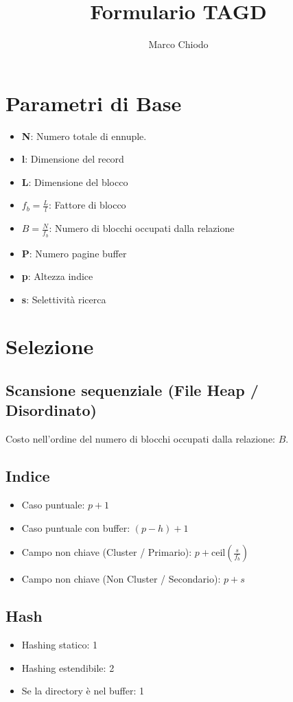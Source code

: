 \documentclass[a4paper, 11pt]{article}
\title{Formulario TAGD}
\author{Marco Chiodo}
\date{} %
\begin{document}
\maketitle


\section{Parametri di Base}
\begin{itemize}
    \item \textbf{N}: Numero totale di ennuple.
    \item \textbf{l}: Dimensione del record
    \item \textbf{L}: Dimensione del blocco
    \item \textbf{$f_b = \frac Ll$}: Fattore di blocco
    \item \textbf{$B = \frac N{f_b}$}: Numero di blocchi occupati dalla relazione
    \item \textbf{P}: Numero pagine buffer
    \item \textbf{p}: Altezza indice
    \item \textbf{s}: Selettività ricerca
\end{itemize}


\section{Selezione}
\subsection{Scansione sequenziale (File Heap / Disordinato)}
Costo nell'ordine del numero di blocchi occupati dalla relazione: $B$.

\subsection{Indice}
\begin{itemize}
    \item Caso puntuale: $p+1$
    \item Caso puntuale con buffer: $(p-h)+1$
    \item Campo non chiave (Cluster / Primario): $p+\text{ceil}(\frac s{f_b})$
    \item Campo non chiave (Non Cluster / Secondario): $p+s$
\end{itemize}

\subsection{Hash}
\begin{itemize}
    \item Hashing statico: 1
    \item Hashing estendibile: 2
    \item Se la directory è nel buffer: 1
\end{itemize}
\end{document}
